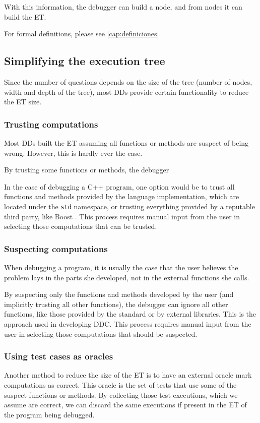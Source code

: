 With this information, the debugger can build a node, and from nodes it can build the ET.

For formal definitions, please see \autoref{cap:definiciones}.
\subsection{Simplifying the execution tree}

Since the number of questions depends on the size of the tree (number of nodes, width and depth of the tree), most DDs provide certain functionality to reduce the ET size.

\subsubsection{Trusting computations}

Most DDs built the ET assuming all functions or methods are suspect of being wrong.
However, this is hardly ever the case.

By trusting some functions or methods, the debugger 

In the case of debugging a C++ program, one option would be to trust all functions and methods provided by the language implementation, which are located under the \verb|std| namespace, or trusting everything provided by a reputable third party, like Boost \cite{TheBoostLibraries}.
This process requires manual input from the user in selecting those computations that can be trusted.
\subsubsection{Suspecting computations}

When debugging a program, it is usually the case that the user believes the problem lays in the parts she developed, not in the external functions she calls.

By suspecting only the functions and methods developed by the user (and implicitly trusting all other functions), the debugger can ignore all other functions, like those provided by the standard or by external libraries.
This is the approach used in developing DDC.
This process requires manual input from the user in selecting those computations that should be suspected.
\subsubsection{Using test cases as oracles}
Another method to reduce the size of the ET is to have an external oracle mark computations as correct.
This oracle is the set of tests that use some of the suspect functions or methods. By collecting those test executions, which we assume are correct, we can discard the same executions if present in the ET of the program being debugged.

